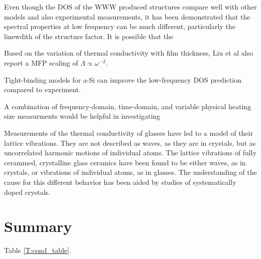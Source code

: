 \documentclass[aps,prb,twocolumn,superscriptaddress,footinbib,amsmath,amssymb,floatfix]{revtex4}
\begin{document}
Even though the DOS of the WWW produced structures compare well with 
other models and also experimental measurements, it has been 
demonstrated that the spectral properties at low frequency can be 
much different, particularly the linewdith of the structure 
factor.\cite{liu_high_2009} It is possible that the 

Based on the variation of thermal conductivity with film thickness, 
Liu et al also report a MFP scaling of 
$\Lambda \propto \omega^{-2}$.\cite{liu_high_2009} 

Tight-binding models for a-Si can improve the low-frequency 
DOS prediction compared to experiment.\cite{feldman_tight-binding_2004}


A combination of frequency-domain, time-domain, and variable 
physical heating size measurments would be helpful in investigating
\cite{koh_frequency_2007,siemens_quasi-ballistic_2010,
minnich_thermal_2011,regner_broadband_2013}


Measurements of the thermal conductivity of glasses have led to a model 
of their lattice vibrations. They are not described as waves, as
they are in crystals, but as uncorrelated harmonic motions of 
individual atoms. The lattice vibrations of fully cerammed, 
crystalline glass
ceramics have been found to be either waves, as in crystals, or 
vibrations of individual atoms, as in glasses. The understanding of the
cause for this different behavior has been aided by studies of 
systematically doped crystals.\cite{pohl_lattice_2006}


\section{\label{S:Lifetimes}Summary}

Table \ref{T:cond_table}.
\end{document}

